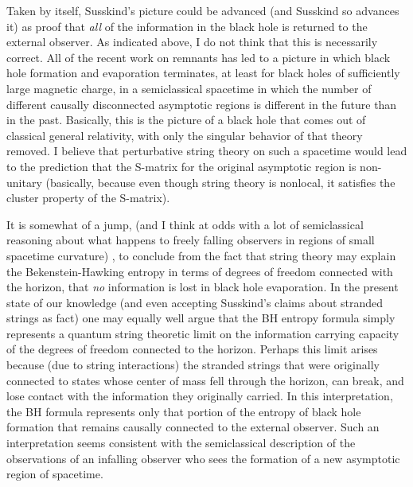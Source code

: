 Taken by itself, Susskind's picture could be advanced (and Susskind so advances
it)
as proof that {\it all} of the information in the black hole is returned
to the external observer.  As indicated above, I do not think that this
is necessarily correct.  All of the recent work on remnants has led to a
picture
in which black hole formation and
evaporation terminates, at least for black holes of sufficiently
large magnetic charge, in a semiclassical spacetime in which the number of
different causally disconnected asymptotic regions is different in the future
than in the past.  Basically, this is the picture of a black hole
that comes out of classical general relativity, with only the singular behavior
of that theory removed.  I believe that perturbative string theory on
such a spacetime would lead to the prediction that the S-matrix for the
original asymptotic region is non-unitary (basically, because even though
string theory is nonlocal, it satisfies the cluster property of the S-matrix).

It is somewhat of a jump, (and I think at odds with a lot of semiclassical
reasoning about what happens to freely falling observers in regions of
small spacetime curvature) , to conclude from the fact that string theory may
explain the Bekenstein-Hawking entropy in terms of degrees of freedom
connected with the horizon, that {\it no} information is lost in black hole
evaporation.  In the present state of our knowledge (and even accepting
Susskind's claims about stranded strings as fact) one may equally well
argue that the BH entropy formula simply represents a quantum string theoretic
limit on the information carrying capacity of the degrees of freedom
connected to the horizon.  Perhaps this limit arises because (due to string
interactions)
the stranded strings that were originally connected to states whose center of
mass fell through the horizon, can break, and lose contact with the
information they originally carried.  In this interpretation,
the BH formula represents only that portion
of the entropy of black hole formation
that remains causally connected to the external observer.
Such an interpretation seems consistent with the semiclassical
description of the observations of an infalling observer who sees the
formation of a new asymptotic region of spacetime.

